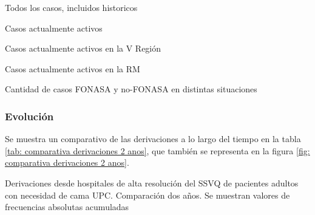 \documentclass{article}
\begin{document}
\begin{table}[h]
	\begin{subtable}{0.5\textwidth}
		\centering
		\begin{adjustbox}{width=0.95\textwidth}
		\end{adjustbox}
		\caption{Todos los casos, incluidos historicos}
	\end{subtable}
	\begin{subtable}{0.5\textwidth}
		\centering
		\begin{adjustbox}{width=0.95\textwidth}
		\end{adjustbox}
		\caption{Casos actualmente activos}
	\end{subtable}
	\medskip
	
	\begin{subtable}{0.5\textwidth}
		\centering
		\begin{adjustbox}{width=0.95\textwidth}
		\end{adjustbox}
		\caption{Casos actualmente activos en la V Región}
	\end{subtable}
	\begin{subtable}{0.5\textwidth}
		\centering
		\begin{adjustbox}{width=0.95\textwidth}
		\end{adjustbox}
		\caption{Casos actualmente activos en la RM}
	\end{subtable}
	\caption{Cantidad de casos FONASA y no-FONASA en distintas situaciones} 
	\label{tab:previsonvsESTABLECIMEITNO}
\end{table}

\subsubsection{Evolución}

Se muestra un comparativo de las derivaciones a lo largo del tiempo en la tabla \ref{tab: comparativa derivaciones 2 anos}, que también se representa en la figura \ref{fig: comparativa derivaciones 2 anos}.


\begin{table}[h]
	\begin{adjustbox}{}
	\end{adjustbox}
	\caption{Derivaciones desde hospitales de alta resolución del SSVQ de pacientes adultos con necesidad de cama UPC. Comparación dos años. Se muestran valores de frecuencias absolutas acumuladas} 
	\label{tab: comparativa derivaciones 2 anos}
\end{table}
\end{document}
